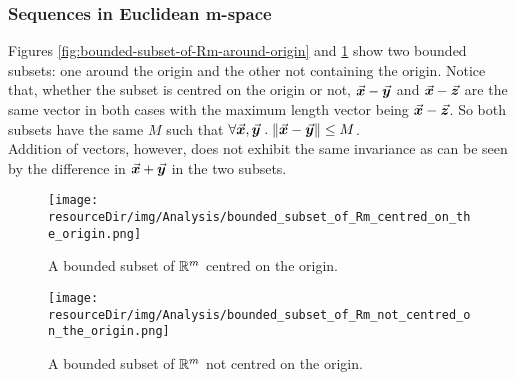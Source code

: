 \documentclass[../MathsNotesBase.tex]{subfiles}
\begin{document}
		\biggerskip
		\subsubsection{Sequences in Euclidean m-space}
		\bigskip
		\label{def:bounded-subset-of-euclidean-m-space}
	
	
		\biggerskip
		\bigskip
		Figures \ref{fig:bounded-subset-of-Rm-around-origin} and \ref{fig:bounded-subset-of-Rm-not-around-origin} show two bounded subsets: one around the origin and the other not containing the origin.
		Notice that, whether the subset is centred on the origin or not, ${ \vec{\bm{x}} - \vec{\bm{y}} }$ and ${ \vec{\bm{x}} - \vec{\bm{z}} }$ are the same vector in both cases with the maximum length vector being ${ \vec{\bm{x}} - \vec{\bm{z}} }$. So both subsets have the same $M$ such that ${ \forall \vec{\bm{x}},\vec{\bm{y}} \;.\; \norm{\vec{\bm{x}} - \vec{\bm{y}}} \leq M }$.\\
		
		Addition of vectors, however, does not exhibit the same invariance as can be seen by the difference in ${ \vec{\bm{x}} + \vec{\bm{y}} }$ in the two subsets.
		
		\begin{figure}[h!]
			\begin{minipage}{0.9\textwidth} 
				\texttt{[image: \\resourceDir/img/Analysis/bounded\_subset\_of\_Rm\_centred\_on\_the\_origin.png]}    
				\caption{A bounded subset of $\mathbb{R}^{m}$ centred on the origin.}
				\label{fig:bounded-subset-of-Rm-around-origin}  
			\end{minipage}
			  
			\vspace{0.75cm}
			\begin{minipage}{0.9\textwidth} 
				\texttt{[image: \\resourceDir/img/Analysis/bounded\_subset\_of\_Rm\_not\_centred\_on\_the\_origin.png]}    
				\caption{A bounded subset of $\mathbb{R}^{m}$ not centred on the origin.}
				\label{fig:bounded-subset-of-Rm-not-around-origin}   
			\end{minipage}			
		\end{figure}
\end{document}

